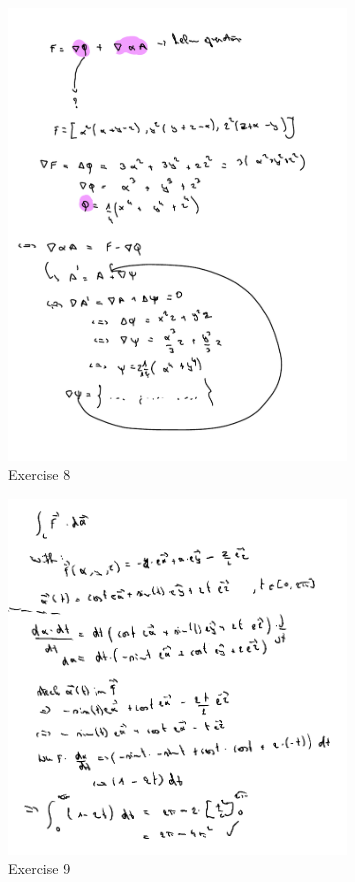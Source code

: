 \documentclass[a4paper]{report}
\begin{document}
\begin{figure}[H]
	\centering
	\includegraphics[width=0.8\textwidth]{assets/huis_6_ex_8.pdf}
	\caption{Exercise 8}
	\label{fig:huis_6_ex_8}
\end{figure}

\begin{figure}[H]
	\centering
	\includegraphics[width=0.8\textwidth]{assets/huis_6_ex_9.png}
	\caption{Exercise 9}
	\label{fig:huis_6_ex_9}
\end{figure}
\end{document}
